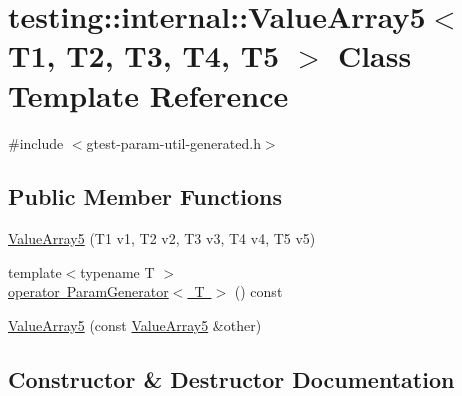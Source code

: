 \hypertarget{classtesting_1_1internal_1_1ValueArray5}{}\section{testing\+::internal\+::Value\+Array5$<$ T1, T2, T3, T4, T5 $>$ Class Template Reference}
\label{classtesting_1_1internal_1_1ValueArray5}


{\ttfamily \#include $<$gtest-\/param-\/util-\/generated.\+h$>$}

\subsection*{Public Member Functions}
\begin{DoxyCompactItemize}
\item 
\mbox{\hyperlink{classtesting_1_1internal_1_1ValueArray5_a9c5687fd18da21263aebc21b9ea508b8}{Value\+Array5}} (T1 v1, T2 v2, T3 v3, T4 v4, T5 v5)
\item 
{\footnotesize template$<$typename T $>$ }\\\mbox{\hyperlink{classtesting_1_1internal_1_1ValueArray5_ab925a168d89be9964c4319e5212222c1}{operator Param\+Generator$<$ T $>$}} () const
\item 
\mbox{\hyperlink{classtesting_1_1internal_1_1ValueArray5_a7de67e844073d0ec3c7c6e5736fb9ba6}{Value\+Array5}} (const \mbox{\hyperlink{classtesting_1_1internal_1_1ValueArray5}{Value\+Array5}} \&other)
\end{DoxyCompactItemize}


\subsection{Constructor \& Destructor Documentation}
\mbox{\label{classtesting_1_1internal_1_1ValueArray5_a9c5687fd18da21263aebc21b9ea508b8}} 
